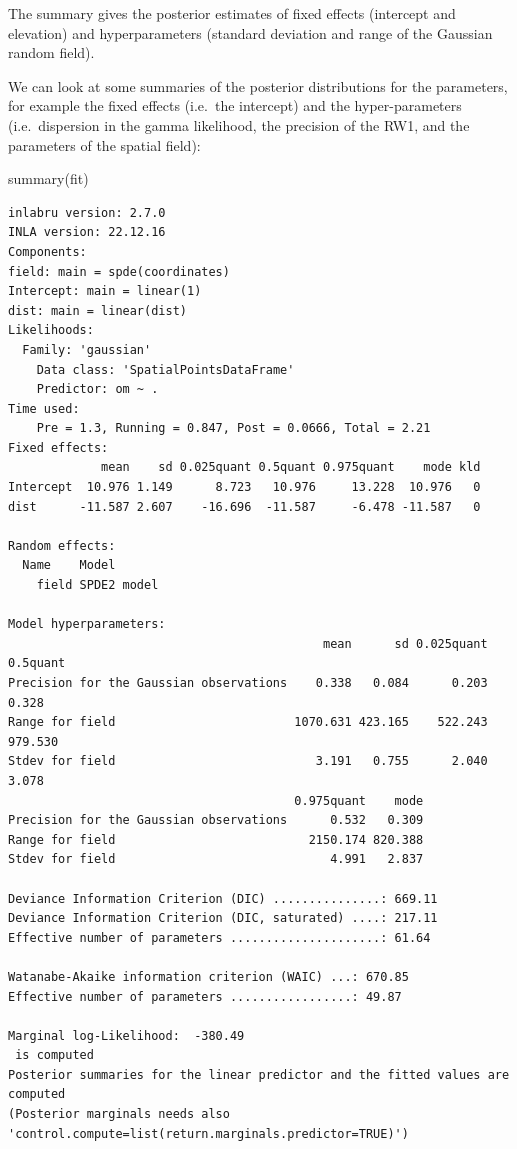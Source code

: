 \documentclass[
  a4paper,
]{article}
\newenvironment{Shaded}{\begin{snugshade}}{\end{snugshade}}
\newcommand{\FunctionTok}[1]{\textcolor[rgb]{0.28,0.35,0.67}{#1}}
\newcommand{\NormalTok}[1]{\textcolor[rgb]{0.00,0.23,0.31}{#1}}
\begin{document}
The summary gives the posterior estimates of fixed effects (intercept
and elevation) and hyperparameters (standard deviation and range of the
Gaussian random field).

We can look at some summaries of the posterior distributions for the
parameters, for example the fixed effects (i.e.~the intercept) and the
hyper-parameters (i.e.~dispersion in the gamma likelihood, the precision
of the RW1, and the parameters of the spatial field):

\begin{Shaded}
\begin{Highlighting}[]
\FunctionTok{summary}\NormalTok{(fit)}
\end{Highlighting}
\end{Shaded}

\begin{verbatim}
inlabru version: 2.7.0
INLA version: 22.12.16
Components:
field: main = spde(coordinates)
Intercept: main = linear(1)
dist: main = linear(dist)
Likelihoods:
  Family: 'gaussian'
    Data class: 'SpatialPointsDataFrame'
    Predictor: om ~ .
Time used:
    Pre = 1.3, Running = 0.847, Post = 0.0666, Total = 2.21 
Fixed effects:
             mean    sd 0.025quant 0.5quant 0.975quant    mode kld
Intercept  10.976 1.149      8.723   10.976     13.228  10.976   0
dist      -11.587 2.607    -16.696  -11.587     -6.478 -11.587   0

Random effects:
  Name    Model
    field SPDE2 model

Model hyperparameters:
                                            mean      sd 0.025quant 0.5quant
Precision for the Gaussian observations    0.338   0.084      0.203    0.328
Range for field                         1070.631 423.165    522.243  979.530
Stdev for field                            3.191   0.755      2.040    3.078
                                        0.975quant    mode
Precision for the Gaussian observations      0.532   0.309
Range for field                           2150.174 820.388
Stdev for field                              4.991   2.837

Deviance Information Criterion (DIC) ...............: 669.11
Deviance Information Criterion (DIC, saturated) ....: 217.11
Effective number of parameters .....................: 61.64

Watanabe-Akaike information criterion (WAIC) ...: 670.85
Effective number of parameters .................: 49.87

Marginal log-Likelihood:  -380.49 
 is computed 
Posterior summaries for the linear predictor and the fitted values are computed
(Posterior marginals needs also 'control.compute=list(return.marginals.predictor=TRUE)')
\end{verbatim}
\end{document}
